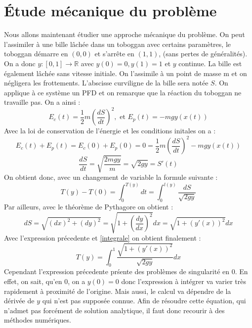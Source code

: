 \documentclass[a4paper,10pt]{article}
\begin{document}
\section{\'Etude m\'ecanique du probl\`eme}
Nous allons maintenant \'etudier une approche m\'ecanique du probl\`eme. On peut l'assimiler \`a une bille l\^ach\'ee dans un toboggan avec certains param\`etres, le toboggan d\'emarre en $(0,0)$
et s'arrête en $(1,1)$, (sans pertes de g\'en\'eralit\'es). On a donc $y : [0,1]\longrightarrow \mathbb{R}$ avec $y(0) = 0, y(1) = 1$ et $y$ continue. La bille est \'egalement l\^ach\'ee sans vitesse initiale.
On l'assimile \`a un point de masse m et on n\'egligera les frottements. L'abscisse curviligne de la bille sera not\'ee $S$.
\newline
On applique \`a ce syst\`eme un PFD et on remarque que la r\'eaction du toboggan ne travaille pas. On a ainsi :
\begin{equation}
 E_c(t) = \frac{1}{2}m(\frac{dS}{dt})^2, \text{ et } E_p(t) = -mgy(x(t))
\end{equation}
Avec la loi de conservation de l'\'energie et les conditions initales on a :
\begin{equation}
 E_c(t) + E_p(t) = E_c(0) + E_p(0) = 0 = \frac{1}{2}m(\frac{dS}{dt})^2 - mgy(x(t)) 
\end{equation}
\begin{equation}
 \frac{dS}{dt}=\sqrt{\frac{2mgy}{m}} = \sqrt{2gy} = S'(t)
\end{equation}
On obtient donc, avec un changement de variable la formule suivante :
\begin{equation}
\label{integrale}
 T(y) - T(0) = \int_0^{T(y)} dt = \int_0^{l(y)} \frac{dS}{\sqrt{2gy}}
\end{equation}
Par ailleurs, avec le th\'eor\`eme de Pythagore on obtient :
\begin{equation}
 dS = \sqrt{(dx)^2 + (dy)^2} = \sqrt{1 + (\frac{dy}{dx})^2}dx = \sqrt{1 + (y'(x))^2}dx
\end{equation}
Avec l'expression pr\'ecedente et \ref{integrale} on obtient finalement :
\begin{equation}
 T(y) = \int_0^1 \frac{\sqrt{1 + (y'(x))^2}}{\sqrt{2gy}}dx
\end{equation}
Cependant l'expression pr\'ecedente pr\'sente des probl\`emes de singularit\'e en 0. En effet, on sait, qu'en 0, on a $y(0) = 0$ donc l'expression \`a int\'egrer  va varier tr\`es rapidement
\`a proximité de l'origine. Mais aussi, le calcul va d\'ependre de la d\'eriv\'ee de $y$ qui n'est pas suppos\'ee connue. Afin de r\'esoudre cette \'equation, qui n'admet pas forc\'ement de solution
analytique, il faut donc recourir \`a des m\'ethodes num\'eriques. 
\end{document}
